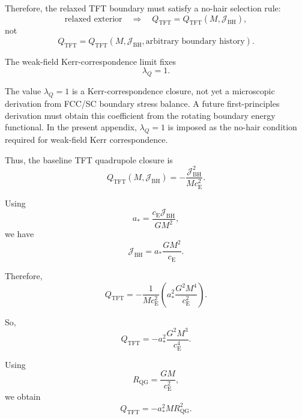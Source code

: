 Therefore, the relaxed TFT boundary must satisfy a no-hair selection rule:
\begin{equation}
    \text{relaxed exterior} \quad \Rightarrow \quad Q_{\mathrm{TFT}} = Q_{\mathrm{TFT}}(M,\mathcal{J}_{\mathrm{BH}}),
\end{equation}
not
\begin{equation}
    Q_{\mathrm{TFT}} = Q_{\mathrm{TFT}}(M,\mathcal{J}_{\mathrm{BH}},\text{arbitrary boundary history}).
\end{equation}

The weak-field Kerr-correspondence limit fixes
\begin{equation}
    \lambda_Q=1.
\end{equation}

The value $\lambda_Q = 1$ is a Kerr-correspondence closure, not yet a microscopic derivation from FCC/SC boundary stress balance. A future first-principles derivation must obtain this coefficient from the rotating boundary energy functional. In the present appendix, $\lambda_Q = 1$ is imposed as the no-hair condition required for weak-field Kerr correspondence.

Thus, the baseline TFT quadrupole closure is
\begin{equation}
    \boxed{ Q_{\mathrm{TFT}}(M,\mathcal{J}_{\mathrm{BH}}) = -\frac{\mathcal{J}_{\mathrm{BH}}^2}{M c_{\mathrm{E}}^2}. }
\end{equation}

Using
\begin{equation}
    a_\ast = \frac{c_{\mathrm{E}}\mathcal{J}_{\mathrm{BH}}}{GM^2},
\end{equation}
we have
\begin{equation}
    \mathcal{J}_{\mathrm{BH}} = a_\ast \frac{GM^2}{c_{\mathrm{E}}}.
\end{equation}

Therefore,
\begin{equation}
    Q_{\mathrm{TFT}} = -\frac{1}{M c_{\mathrm{E}}^2} \left( a_\ast^2 \frac{G^2M^4}{c_{\mathrm{E}}^2} \right).
\end{equation}

So,
\begin{equation}
    Q_{\mathrm{TFT}} = -a_\ast^2 \frac{G^2M^3}{c_{\mathrm{E}}^4}.
\end{equation}

Using
\begin{equation}
    R_{\mathrm{QG}} = \frac{GM}{c_{\mathrm{E}}^2},
\end{equation}
we obtain
\begin{equation}
    \boxed{ Q_{\mathrm{TFT}} = -a_\ast^2 M R_{\mathrm{QG}}^2. }
\end{equation}

